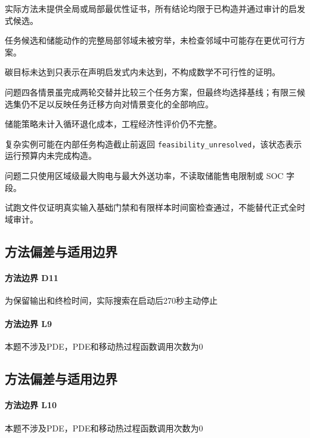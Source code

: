 实际方法未提供全局或局部最优性证书，所有结论均限于已构造并通过审计的启发式候选。

任务候选和储能动作的完整局部邻域未被穷举，未检查邻域中可能存在更优可行方案。

碳目标未达到只表示在声明启发式内未达到，不构成数学不可行性的证明。

问题四各情景虽完成两轮交替并比较三个任务方案，但最终均选择基线；有限三候选集仍不足以反映任务迁移方向对情景变化的全部响应。

储能策略未计入循环退化成本，工程经济性评价仍不完整。

复杂实例可能在内部任务构造截止前返回 \texttt{feasibility\_unresolved}，该状态表示运行预算内未完成构造。

问题二只使用区域级最大购电与最大外送功率，不读取储能售电限制或 SOC 字段。

试跑文件仅证明真实输入基础门禁和有限样本时间窗检查通过，不能替代正式全时域审计。


\subsection{方法偏差与适用边界}
\paragraph{方法边界 D11}为保留输出和终检时间，实际搜索在启动后270秒主动停止

\paragraph{方法边界 L9}本题不涉及PDE，PDE和移动热过程函数调用次数为0


\subsection{方法偏差与适用边界}
\paragraph{方法边界 L10}本题不涉及PDE，PDE和移动热过程函数调用次数为0
